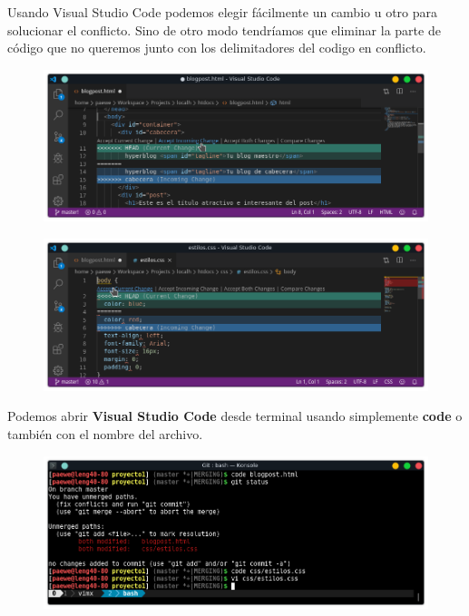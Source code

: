 \documentclass{article}
\begin{document}
Usando Visual Studio Code podemos elegir fácilmente un cambio u otro para
solucionar el conflicto. Sino de otro modo tendríamos que eliminar la parte de
código que no queremos junto con los delimitadores del codigo en conflicto.

\begin{figure}[h!]
  \centering
  \includegraphics[scale=0.75]{./Pictures/179_conflict_blogpost.png}
\end{figure}

\newpage

\begin{figure}[h!]
  \centering
  \includegraphics[scale=0.75]{./Pictures/180_conflict_css.png}
\end{figure}

Podemos abrir \textbf{Visual Studio Code} desde terminal usando simplemente
\textbf{code} o también con el nombre del archivo.

\begin{figure}[h!]
  \centering
  \includegraphics[scale=0.75]{./Pictures/181_konsole_conflict.png}
\end{figure}
\end{document}
